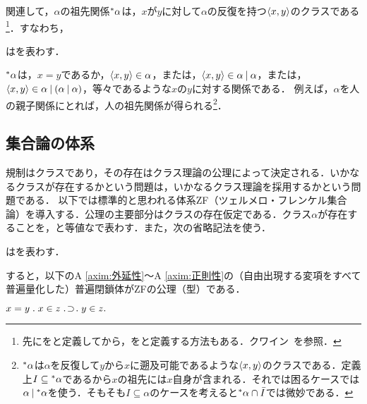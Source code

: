 関連して，$\alpha$の祖先関係$\ance{\alpha}$は，$x$が$y$に対して$\alpha$の反復を持つ$\langle x,y \rangle$のクラスである\footnote{
    先に\kagi{$ \ance{\alpha} $}をと定義してから，をと定義する方法もある．クワイン~\cite[pp.\,93--95]{クワインa}を参照．
}．すなわち，

\begin{df}
\label{df:祖先関係}
\kagi{$
    \ance{\alpha}
$}はを表わす．
\end{df}

\noindent $\ance{\alpha}$は，$x=y$であるか，$\langle x,y \rangle\in\alpha$，または，$\langle x,y \rangle\in\alpha\mathbin{\mid}\alpha$，または，$\langle x,y \rangle\in\alpha\mathbin{\mid}(\alpha\mathbin{\mid}\alpha)$，等々であるような$x$の$y$に対する関係である．
例えば，$\alpha$を人の親子関係にとれば，人の祖先関係が得られる\footnote{
$\ance{\alpha}$は$\alpha$を反復して$y$から$x$に遡及可能であるような$\langle x,y \rangle$のクラスである．定義上$ I\subseteq{^*}\alpha $であるから$x$の祖先には$x$自身が含まれる．それでは困るケースでは$\alpha\mathbin{\mid}{^*}\alpha$を使う．そもそも$I\subseteq\alpha$のケースを考えると${^*}\alpha\cap\bar{I}$では微妙である．}．

\subsection{集合論の体系}
\label{ssec:集合論の体系}

規制はクラスであり，その存在はクラス理論の公理によって決定される．いかなるクラスが存在するかという問題は，いかなるクラス理論を採用するかという問題である．
以下では標準的と思われる体系ZF（ツェルメロ・フレンケル集合論）を導入する．公理の主要部分はクラスの存在仮定である．クラス$\alpha$が存在することを，と等値な\kagi{$ \alpha\in\univ $}で表わす．また，次の省略記法を使う．
\begin{df}[冪集合]
\label{df:冪集合}
はを表わす．
\end{df}

\noindent すると，以下のA \ref{axim:外延性}〜A \ref{axim:正則性}の（自由出現する変項をすべて普遍量化した）普遍閉鎖体がZFの公理（型）である．

\begin{axim}[外延性]
\label{axim:外延性}
$
    x=y\con{1}x\in z\case{1}{1}{1}y\in z.
$
\end{axim}


